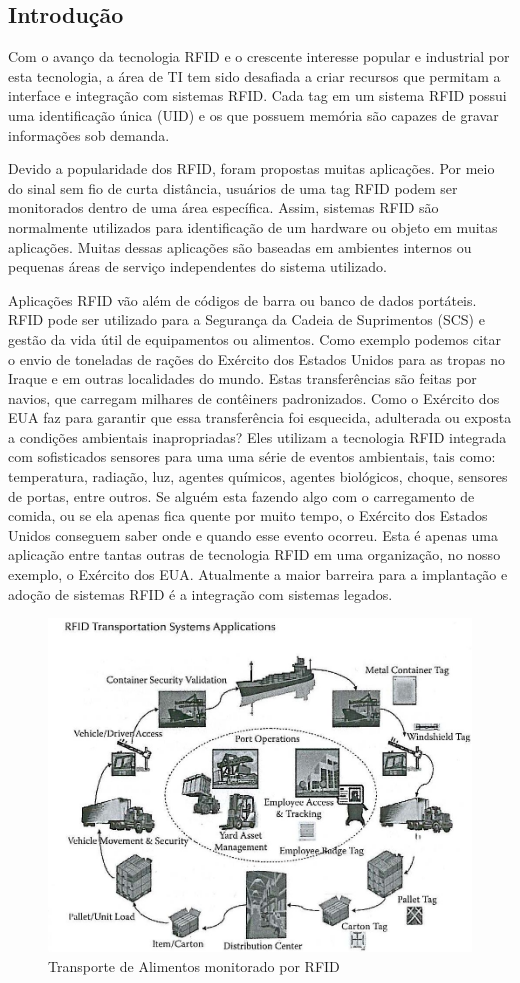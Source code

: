 

\subsection{Introdução}
		Com o avanço da tecnologia RFID e o crescente interesse popular e industrial por esta tecnologia, a área de TI tem sido desafiada a criar recursos que permitam a interface e integração com sistemas RFID. Cada tag em um sistema RFID possui uma identificação única (UID) e os que possuem memória são capazes de gravar informações sob demanda.
	
		Devido a popularidade dos RFID, foram propostas muitas aplicações. Por meio do sinal sem fio de curta distância, usuários de uma tag RFID podem ser monitorados dentro de uma área específica. Assim, sistemas RFID são normalmente utilizados para identificação de um hardware ou objeto em muitas aplicações. Muitas dessas aplicações são baseadas em ambientes internos ou pequenas áreas de serviço independentes do sistema utilizado.
	
		Aplicações RFID vão além de códigos de barra ou banco de dados portáteis. RFID pode ser utilizado para a Segurança da Cadeia de Suprimentos (SCS) e gestão da vida útil de equipamentos ou alimentos. Como exemplo podemos citar o envio de toneladas de rações do Exército dos Estados Unidos para as tropas no Iraque e em outras localidades do mundo. Estas transferências são feitas por navios, que carregam milhares de contêiners padronizados. Como o Exército dos EUA faz para garantir que essa transferência foi esquecida, adulterada ou exposta a condições ambientais inapropriadas? Eles utilizam a tecnologia RFID integrada com sofisticados sensores para uma uma série de eventos ambientais, tais como: temperatura, radiação, luz, agentes químicos, agentes biológicos, choque, sensores de portas, entre outros. Se alguém esta fazendo algo com o carregamento de comida, ou se ela apenas fica quente por muito tempo, o Exército dos Estados Unidos conseguem saber onde e quando esse evento ocorreu. Esta é apenas uma aplicação entre tantas outras de tecnologia RFID em uma organização, no nosso exemplo, o Exército dos EUA. Atualmente a maior barreira para a implantação e adoção de sistemas RFID é a integração com sistemas legados.
		
		
		\begin{figure}[h!]
			\centering
				\includegraphics[width=0.7\linewidth]{Ex1SCS.jpg}
			\caption{Transporte de Alimentos monitorado por RFID}
			\label{fig:Ex1SCS}
		\end{figure}
		
